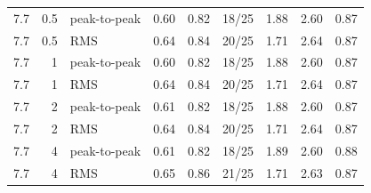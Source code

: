 \begin{tabular}{rr l rrrrrr}
7.7 & 0.5 & peak-to-peak & 0.60 & 0.82 & 18/25 & 1.88 & 2.60 & 0.87 \\
7.7 & 0.5 & RMS & 0.64 & 0.84 & 20/25 & 1.71 & 2.64 & 0.87 \\
7.7 & 1 & peak-to-peak & 0.60 & 0.82 & 18/25 & 1.88 & 2.60 & 0.87 \\
7.7 & 1 & RMS & 0.64 & 0.84 & 20/25 & 1.71 & 2.64 & 0.87 \\
7.7 & 2 & peak-to-peak & 0.61 & 0.82 & 18/25 & 1.88 & 2.60 & 0.87 \\
7.7 & 2 & RMS & 0.64 & 0.84 & 20/25 & 1.71 & 2.64 & 0.87 \\
7.7 & 4 & peak-to-peak & 0.61 & 0.82 & 18/25 & 1.89 & 2.60 & 0.88 \\
7.7 & 4 & RMS & 0.65 & 0.86 & 21/25 & 1.71 & 2.63 & 0.87 \\
\bottomrule
\end{tabular}
